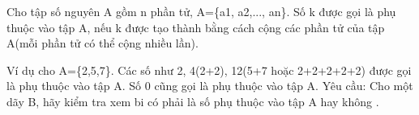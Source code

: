 Cho tập số nguyên A gồm n phần tử, A=\{a1, a2,..., an\}. Số k được gọi là phụ thuộc vào tập A, nếu k được tạo thành bằng cách cộng các phần tử của tập A(mỗi phần tử có thể cộng nhiều lần).  

   Ví dụ  cho A=\{2,5,7\}.  Các số như 2, 4(2+2), 12(5+7 hoặc 2+2+2+2+2) được gọi là phụ thuộc vào tập A. Số 0 cũng gọi là phụ thuộc vào tập A.
   Yêu cầu:  
Cho một dãy B, hãy kiểm tra xem bi có phải là số phụ thuộc vào tập A hay không .